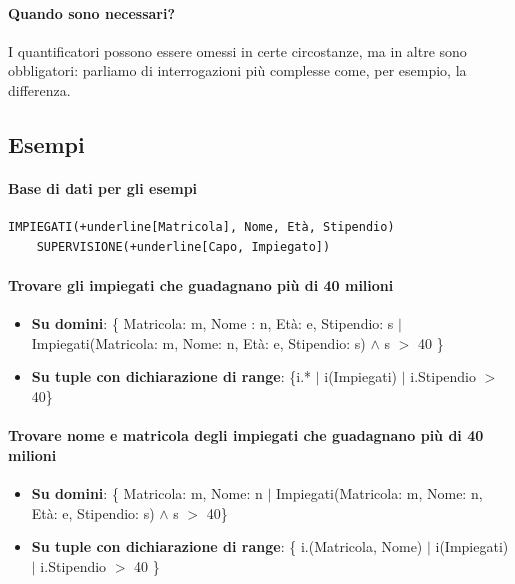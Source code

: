 \paragraph{Quando sono necessari?} I quantificatori possono essere omessi in certe circostanze, ma in altre sono obbligatori: parliamo di interrogazioni più complesse come, per esempio, la differenza.  

\subsection{Esempi}\paragraph{Base di dati per gli esempi}
\begin{Verbatim}[commandchars=+\[\]]
	IMPIEGATI(+underline[Matricola], Nome, Età, Stipendio)
	SUPERVISIONE(+underline[Capo, Impiegato])
\end{Verbatim}
\paragraph{Trovare gli impiegati che guadagnano più di 40 milioni} 
\begin{itemize}
	\item \textbf{Su domini}: \{ Matricola: m, Nome : n, Età: e, Stipendio: s $|$ Impiegati(Matricola: m, Nome: n, Età: e, Stipendio: s) $\land$ s $>$ 40 \}
	\item \textbf{Su tuple con dichiarazione di range}: \{i.* $|$ i(Impiegati) $|$ i.Stipendio $>$ 40\}
\end{itemize}
\paragraph{Trovare nome e matricola degli impiegati che guadagnano più di 40 milioni} 
\begin{itemize}
	\item \textbf{Su domini}: \{ Matricola: m, Nome: n $|$ Impiegati(Matricola: m, Nome: n, Età: e, Stipendio: s) $\land$ s $>$ 40\}
	\item \textbf{Su tuple con dichiarazione di range}: \{ i.(Matricola, Nome) $|$ i(Impiegati) $|$ i.Stipendio $>$ 40 \}
\end{itemize}
